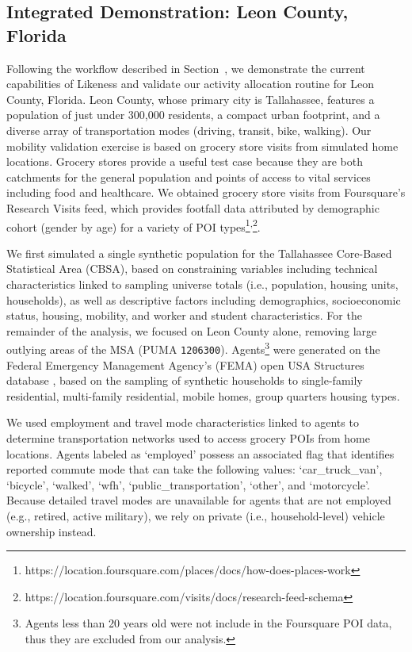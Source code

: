 \subsection{Integrated Demonstration: Leon County, Florida} \label{section:LCFL}

Following the workflow described in Section~, we demonstrate the current capabilities of Likeness and validate our activity allocation routine for Leon County, Florida. Leon County, whose primary city is Tallahassee, features a population of just under 300,000 residents, a compact urban footprint, and a diverse array of transportation modes (driving, transit, bike, walking). Our mobility validation exercise is based on grocery store visits from simulated home locations. Grocery stores provide a useful test case because they are both catchments for the general population and points of access to vital services including food and healthcare. We obtained grocery store visits from Foursquare's Research Visits feed, which provides footfall data attributed by demographic cohort (gender by age) for a variety of POI types\footnote{https://location.foursquare.com/places/docs/how-does-places-work}\textsuperscript{,}\footnote{https://location.foursquare.com/visits/docs/research-feed-schema}. 

We first simulated a single synthetic population for the Tallahassee Core-Based Statistical Area (CBSA), based on constraining variables including technical characteristics linked to sampling universe totals (i.e., population, housing units, households), as well as descriptive factors including demographics, socioeconomic status, housing, mobility, and worker and student characteristics. For the remainder of the analysis, we focused on Leon County alone, removing large outlying areas of the MSA (PUMA \texttt{1206300}). Agents\footnote{Agents less than 20 years old were not include in the Foursquare POI data, thus they are excluded from our analysis.} were generated on the Federal Emergency Management Agency's (FEMA) open USA Structures database \cite{yang2018building, usa_struct_2022}, based on the sampling of synthetic households to single-family residential, multi-family residential, mobile homes, group quarters housing types.

We used employment and travel mode characteristics linked to agents to determine transportation networks used to access grocery POIs from home locations. Agents labeled as `employed' possess an associated flag that identifies reported commute mode that can take the following values: `car\_truck\_van', `bicycle', `walked', `wfh', `public\_transportation', `other', and `motorcycle'. Because detailed travel modes are unavailable for agents that are not employed (e.g., retired, active military), we rely on private (i.e., household-level) vehicle ownership instead.

